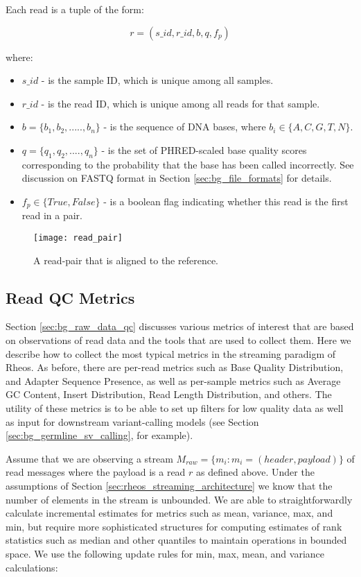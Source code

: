 Each read is a tuple of the form:

\begin{equation}
\label{eq:raw_read_message}
r = (s\_id, r\_id, b, q, f_p)
\end{equation}

where:

\begin{itemize}
    \item $s\_id$ - is the sample ID, which is unique among all samples.
    \item $r\_id$ - is the read ID, which is unique among all reads for that sample.
    \item $b = \{b_1, b_2,.....,b_n\}$ - is the sequence of DNA bases, where $b_i \in \{A,C,G,T,N\}$.
    \item $q = \{q_1, q_2,....,q_n\}$ - is the set of PHRED-scaled base quality scores corresponding to the probability that the base has been called incorrectly. See discussion on FASTQ format in Section \ref{sec:bg_file_formats} for details.
    \item $f_p \in \{True, False\}$ - is a boolean flag indicating whether this read is the first read in a pair.
\end{itemize}

\begin{figure}[h!]
    \texttt{[image: read\_pair]}
    \centering
    \caption {A read-pair that is aligned to the reference.}
    \label{fig:rheos_read_pair}
    \end{figure}
    
\subsection{Read QC Metrics}
\label{sec:main_body_read_qc_metrics}

Section \ref{sec:bg_raw_data_qc} discusses various metrics of interest that are based on observations of read data and the tools that are used to collect them. Here we describe how to collect the most typical metrics in the streaming paradigm of Rheos. As before, there are per-read metrics such as Base Quality Distribution, and Adapter Sequence Presence, as well as per-sample metrics such as Average GC Content, Insert Distribution, Read Length Distribution, and others. The utility of these metrics is to be able to set up filters for low quality data as well as input for downstream variant-calling models (see Section \ref{sec:bg_germline_sv_calling}, for example). 

Assume that we are observing a stream $M_{raw} = \{m_i: m_i = (header, payload)\}$ of read messages where the payload is a read $r$ as defined above. Under the assumptions of Section \ref{sec:rheos_streaming_architecture} we know that the number of elements in the stream is unbounded. We are able to straightforwardly calculate incremental estimates for metrics such as mean, variance, max, and min, but require more sophisticated structures for computing estimates of rank statistics such as median and other quantiles to maintain operations in bounded space. We use the following update rules for min, max, mean, and variance\autocite{welford1962note} calculations:


